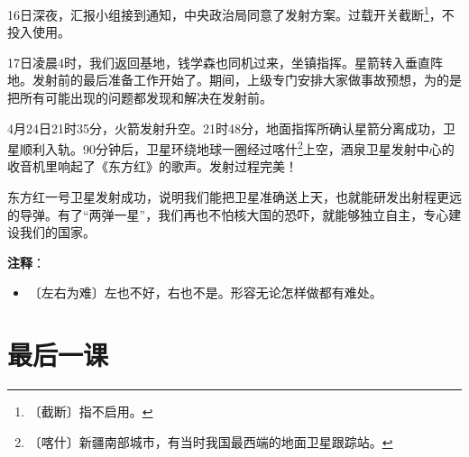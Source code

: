 \documentclass[12pt,UTF-8,openany]{ctexbook}
\begin{document}
\begin{normalsize}
    16日深夜，汇报小组接到通知，中央政治局同意了发射方案。过载开关截断\footnote{〔截断〕指不启用。}，不投入使用。
    
    17日凌晨4时，我们返回基地，钱学森也同机过来，坐镇指挥。星箭转入垂直阵地。发射前的最后准备工作开始了。期间，上级专门安排大家做事故预想，为的是把所有可能出现的问题都发现和解决在发射前。
    
    4月24日21时35分，火箭发射升空。21时48分，地面指挥所确认星箭分离成功，卫星顺利入轨。90分钟后，卫星环绕地球一圈经过喀什\footnote{〔喀什〕新疆南部城市，有当时我国最西端的地面卫星跟踪站。}上空，酒泉卫星发射中心的收音机里响起了《东方红》的歌声。发射过程完美！
    
    东方红一号卫星发射成功，说明我们能把卫星准确送上天，也就能研发出射程更远的导弹。有了“两弹一星”，我们再也不怕核大国的恐吓，就能够独立自主，专心建设我们的国家。
    
\end{normalsize}


\newpage

\textbf{注释}：

\vspace{-1em}

\begin{itemize}
    \setlength\itemsep{-0.2em}
    \item 〔左右为难〕左也不好，右也不是。形容无论怎样做都有难处。
\end{itemize}

\chapter{最后一课}
\end{document}
